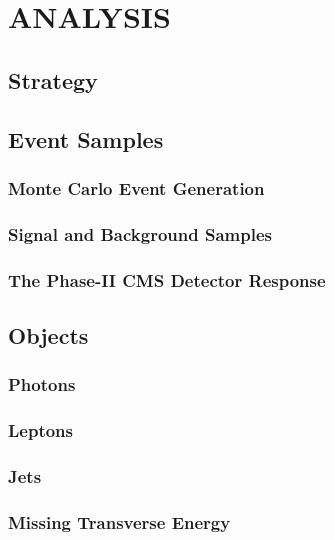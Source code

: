 \chapter{ANALYSIS}\label{ch:Ch3}
\vspace*{-12pt} %

\section{Strategy}

\section{Event Samples}

\subsection{Monte Carlo Event Generation}

\subsection{Signal and Background Samples}

\subsection{The Phase-II CMS Detector Response}

\section{Objects}

\subsection{Photons}

\subsection{Leptons}

\subsection{Jets}

\subsection{Missing Transverse Energy}


